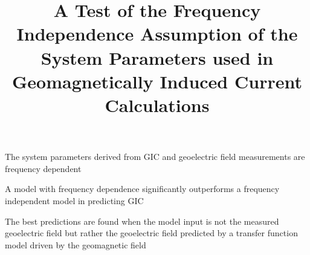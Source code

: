 \documentclass[draft,linenumbers]{agujournal2018}
\begin{document}
\title{A Test of the Frequency Independence Assumption of the System Parameters used in Geomagnetically Induced Current Calculations}

%
%













\begin{keypoints}
\item The system parameters derived from GIC and geoelectric field measurements are frequency dependent
\item A model with frequency dependence significantly outperforms a frequency independent model in predicting GIC
\item The best predictions are found when the model input is not the measured geoelectric field but rather the geoelectric field predicted by a transfer function model driven by the geomagnetic field
\end{keypoints}
\end{document}
